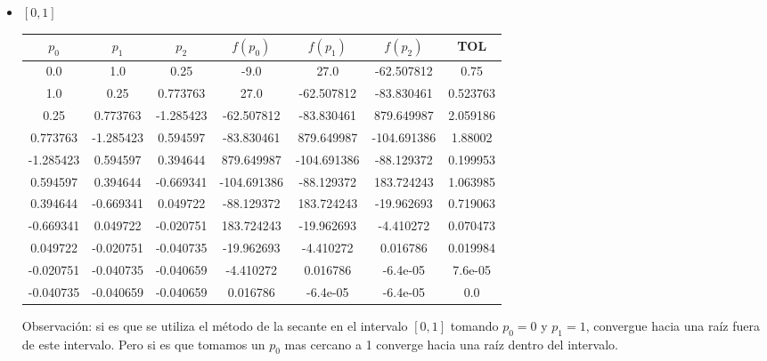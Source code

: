 \documentclass[12pt]{article}
\begin{document}
\begin{enumerate}
\begin{enumerate}
\begin{itemize}
            \item \([0, 1]\)
            \begin{center}
            \begin{tabular}{|c|c|c|c|c|c|c|}
            \hline
            \(p_0\) & \(p_1\)& \(p_2\)&\(f(p_0)\) & \(f(p_1)\) & \(f(p_2)\)&\textbf{TOL} \\
            \hline
            0.0 & 1.0 & 0.25 & -9.0 & 27.0 & -62.507812 & 0.75 \\
            1.0 & 0.25 & 0.773763 & 27.0 & -62.507812 & -83.830461 & 0.523763 \\
            0.25 & 0.773763 & -1.285423 & -62.507812 & -83.830461 & 879.649987 & 2.059186 \\
            0.773763 & -1.285423 & 0.594597 & -83.830461 & 879.649987 & -104.691386 & 1.88002 \\
            -1.285423 & 0.594597 & 0.394644 & 879.649987 & -104.691386 & -88.129372 & 0.199953 \\
            0.594597 & 0.394644 & -0.669341 & -104.691386 & -88.129372 & 183.724243 & 1.063985 \\
            0.394644 & -0.669341 & 0.049722 & -88.129372 & 183.724243 & -19.962693 & 0.719063 \\
            -0.669341 & 0.049722 & -0.020751 & 183.724243 & -19.962693 & -4.410272 & 0.070473 \\
            0.049722 & -0.020751 & -0.040735 & -19.962693 & -4.410272 & 0.016786 & 0.019984 \\
            -0.020751 & -0.040735 & -0.040659 & -4.410272 & 0.016786 & -6.4e-05 & 7.6e-05 \\
            -0.040735 & -0.040659 & -0.040659 & 0.016786 & -6.4e-05 & -6.4e-05 & 0.0 \\
            \hline 
            \end{tabular}
            \end{center}
            Observación: si es que se utiliza el método de la secante en el intervalo \([0, 1]\) tomando \(p_0 = 0\) y \(p_1 = 1\), convergue hacia una raíz fuera de este intervalo.
            Pero si es que tomamos un \(p_0\) mas cercano a 1 converge hacia una raíz dentro del intervalo.
            

\end{itemize}
\end{enumerate}
\end{enumerate}
\end{document}

